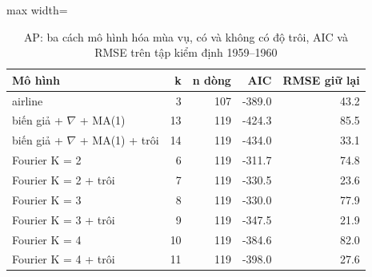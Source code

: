 \begin{table}[H]
\centering\footnotesize
\caption{AP: ba cách mô hình hóa mùa vụ, có và không có độ trôi, AIC và RMSE trên tập kiểm định 1959--1960}\label{tab:tab_b12_10_seasonality_models}
\begin{adjustbox}{max width=\linewidth}
\begin{tabular}{|>{\raggedright\arraybackslash}p{}|r|r|r|r|}
\toprule
Mô hình & k & n dòng & AIC & RMSE giữ lại \\
\midrule
airline & 3 & 107 & -389.0 & 43.2 \\[3pt]
11 biến giả + $\nabla$ + MA(1) & 13 & 119 & -424.3 & 85.5 \\[3pt]
11 biến giả + $\nabla$ + MA(1) + trôi & 14 & 119 & -434.0 & 33.1 \\[3pt]
Fourier K = 2 & 6 & 119 & -311.7 & 74.8 \\[3pt]
Fourier K = 2 + trôi & 7 & 119 & -330.5 & 23.6 \\[3pt]
Fourier K = 3 & 8 & 119 & -330.0 & 77.9 \\[3pt]
Fourier K = 3 + trôi & 9 & 119 & -347.5 & 21.9 \\[3pt]
Fourier K = 4 & 10 & 119 & -384.6 & 82.0 \\[3pt]
Fourier K = 4 + trôi & 11 & 119 & -398.0 & 27.6 \\[3pt]
\bottomrule
\end{tabular}
\end{adjustbox}\par{}
\end{table}

